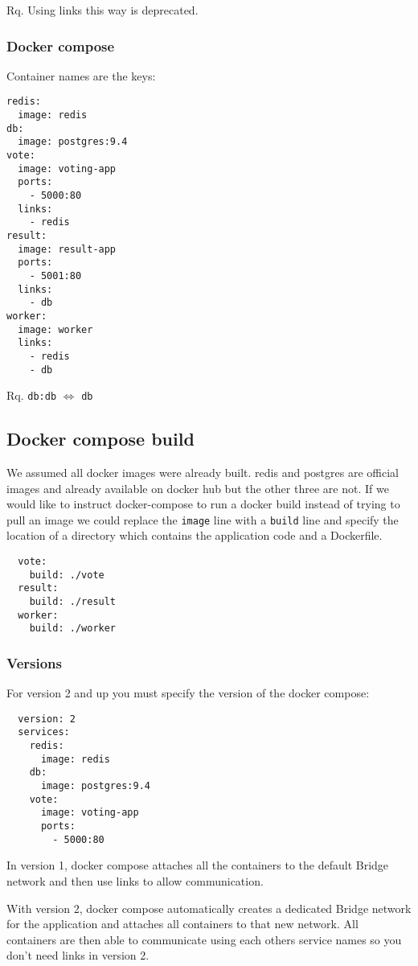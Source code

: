 \documentclass[french]{article}
\begin{document}
Rq. Using links this way is deprecated.

\subsubsection{Docker compose}

Container names are the keys:
\begin{verbatim}
redis:
  image: redis
db:
  image: postgres:9.4
vote:
  image: voting-app
  ports:
    - 5000:80
  links:
    - redis
result:
  image: result-app
  ports:
    - 5001:80
  links:
    - db
worker:
  image: worker
  links:
    - redis
    - db
\end{verbatim}

Rq. \verb|db:db| $\Leftrightarrow$ \verb|db|

\subsection{Docker compose build}

We assumed all docker images were already built. redis and postgres are official images and already available on docker hub but the other three are not. If we would like to instruct docker-compose to run a docker build instead of trying to pull an image we could replace the \verb|image| line with a \verb|build| line and specify the location of a directory which contains the application code and a Dockerfile.
\begin{verbatim}
  vote:
    build: ./vote
  result:
    build: ./result
  worker:
    build: ./worker
\end{verbatim}

\subsubsection{Versions}

For version 2 and up you must specify the version of the docker compose:
\begin{verbatim}
  version: 2
  services:
    redis:
      image: redis
    db:
      image: postgres:9.4
    vote:
      image: voting-app
      ports:
        - 5000:80
\end{verbatim}

In version 1, docker compose attaches all the containers to the default Bridge network and then use links to allow communication.

With version 2, docker compose automatically creates a dedicated Bridge network for the application and attaches all containers to that new network. All containers are then able to communicate using each others service names so you don't need links in version 2.
\end{document}
